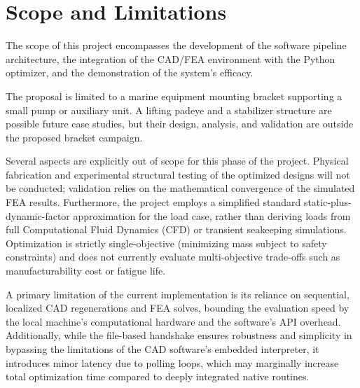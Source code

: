 \section{Scope and Limitations}
The scope of this project encompasses the development of the software pipeline architecture, the integration of the CAD/FEA environment with the Python optimizer, and the demonstration of the system's efficacy. 

The proposal is limited to a marine equipment mounting bracket supporting a small pump or auxiliary unit. A lifting padeye and a stabilizer structure are possible future case studies, but their design, analysis, and validation are outside the proposed bracket campaign.

Several aspects are explicitly out of scope for this phase of the project. Physical fabrication and experimental structural testing of the optimized designs will not be conducted; validation relies on the mathematical convergence of the simulated FEA results. Furthermore, the project employs a simplified standard static-plus-dynamic-factor approximation for the load case, rather than deriving loads from full Computational Fluid Dynamics (CFD) or transient seakeeping simulations. Optimization is strictly single-objective (minimizing mass subject to safety constraints) and does not currently evaluate multi-objective trade-offs such as manufacturability cost or fatigue life. 

A primary limitation of the current implementation is its reliance on sequential, localized CAD regenerations and FEA solves, bounding the evaluation speed by the local machine's computational hardware and the software's API overhead. Additionally, while the file-based handshake ensures robustness and simplicity in bypassing the limitations of the CAD software's embedded interpreter, it introduces minor latency due to polling loops, which may marginally increase total optimization time compared to deeply integrated native routines.
